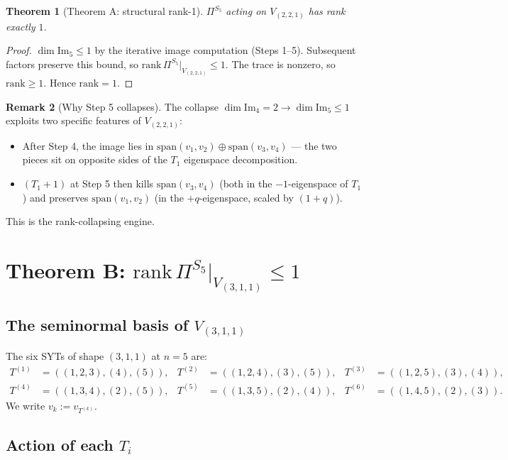 \documentclass[11pt]{article}
\newtheorem{theorem}{Theorem}
\theoremstyle{definition}
\newtheorem{remark}[theorem]{Remark}
\begin{document}
\begin{theorem}[Theorem A: structural rank-1]\label{thm:221}
$\Pi^{S_5}$ acting on $V_{(2,2,1)}$ has rank exactly $1$.
\end{theorem}

\begin{proof}
$\dim \mathrm{Im}_5 \leq 1$ by the iterative image computation
(Steps 1--5). Subsequent factors preserve this bound, so
$\mathrm{rank}\,\Pi^{S_5}|_{V_{(2,2,1)}} \leq 1$. The trace is nonzero,
so $\mathrm{rank} \geq 1$. Hence $\mathrm{rank} = 1$.
\end{proof}

\begin{remark}[Why Step 5 collapses]
The collapse $\dim \mathrm{Im}_4 = 2 \to \dim \mathrm{Im}_5 \leq 1$
exploits two specific features of $V_{(2,2,1)}$:
\begin{itemize}[topsep=0.3em,itemsep=0.2em,leftmargin=2em]
\item After Step 4, the image lies in
$\mathrm{span}(v_1, v_2)\oplus\mathrm{span}(v_3, v_4)$
--- the two pieces sit on opposite sides of the
$T_1$ eigenspace decomposition.
\item $(T_1{+}1)$ at Step 5 then kills $\mathrm{span}(v_3, v_4)$
(both in the $-1$-eigenspace of $T_1$) and preserves
$\mathrm{span}(v_1, v_2)$ (in the $+q$-eigenspace, scaled by $(1{+}q)$).
\end{itemize}
This is the rank-collapsing engine.
\end{remark}

\section{Theorem B: $\mathrm{rank}\,\Pi^{S_5}|_{V_{(3,1,1)}} \leq 1$}
\label{sec:311-rank1}

\subsection{The seminormal basis of $V_{(3,1,1)}$}

The six SYTs of shape $(3,1,1)$ at $n=5$ are:
\begin{align*}
T^{(1)} &= ((1,2,3),(4),(5)), &
T^{(2)} &= ((1,2,4),(3),(5)), &
T^{(3)} &= ((1,2,5),(3),(4)), \\
T^{(4)} &= ((1,3,4),(2),(5)), &
T^{(5)} &= ((1,3,5),(2),(4)), &
T^{(6)} &= ((1,4,5),(2),(3)).
\end{align*}
We write $v_k := v_{T^{(k)}}$.

\subsection{Action of each $T_i$}
\end{document}
